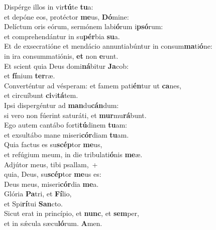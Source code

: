 \evenverse Dispérge illos in vir\textbf{tú}te \textbf{tu}a:~\*\\
\evenverse et depóne eos, protéctor \textbf{me}us, \textbf{Dó}mine:\\
\oddverse Delíctum oris eórum, sermónem labi\textbf{ó}rum i\textbf{psó}rum:~\*\\
\oddverse et comprehendántur in su\textbf{pér}bia \textbf{su}a.\\
\evenverse Et de exsecratióne et mendácio annuntiabúntur in consum\textbf{ma}ti\textbf{ó}ne:~\*\\
\evenverse in ira consummatiónis, \textbf{et} non \textbf{e}runt.\\
\oddverse Et scient quia Deus domi\textbf{ná}bitur \textbf{Ja}cob:~\*\\
\oddverse et \textbf{fí}nium \textbf{ter}ræ.\\
\evenverse Converténtur ad vésperam: et famem pati\textbf{én}tur ut \textbf{ca}nes,~\*\\
\evenverse et circuíbunt \textbf{ci}vi\textbf{tá}tem.\\
\oddverse Ipsi dispergéntur ad \textbf{man}du\textbf{cán}dum:~\*\\
\oddverse si vero non fúerint saturáti, et \textbf{mur}mu\textbf{rá}bunt.\\
\evenverse Ego autem cantábo forti\textbf{tú}dinem \textbf{tu}am:~\*\\
\evenverse et exsultábo mane miseri\textbf{cór}diam \textbf{tu}am.\\
\oddverse Quia factus es su\textbf{scép}tor \textbf{me}us,~\*\\
\oddverse et refúgium meum, in die tribulati\textbf{ó}nis \textbf{me}æ.\\
\evenverse Adjútor meus, tibi psallam,~+\\
\evenverse  quia, Deus, su\textbf{scép}tor \textbf{me}us es:~\*\\
\evenverse Deus meus, miseri\textbf{cór}dia \textbf{me}a.\\
\oddverse Glória \textbf{Pa}tri, et \textbf{Fí}lio,~\*\\
\oddverse et Spi\textbf{rí}tui \textbf{San}cto.\\
\evenverse Sicut erat in princípio, et \textbf{nunc}, et \textbf{sem}per,~\*\\
\evenverse et in sǽcula sæcu\textbf{ló}rum. \textbf{A}men.\\
